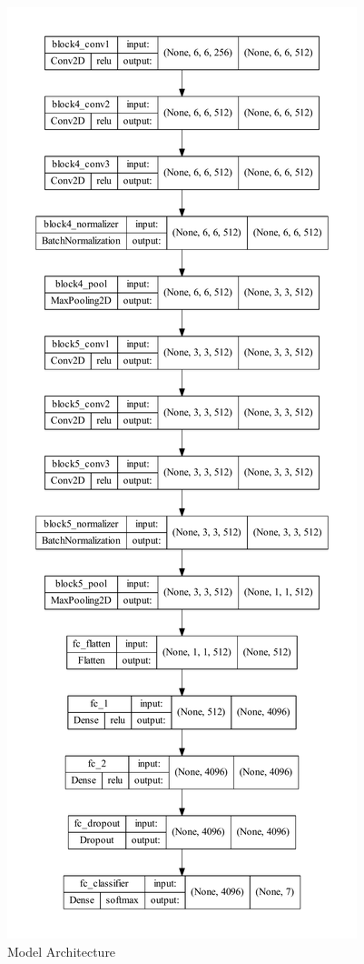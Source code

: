 \documentclass[11pt,a4paper]{article}
\begin{document}
\begin{figure}[H]
\begin{minipage}[b]{.4\textwidth}
        \end{minipage}
        \begin{minipage}[b]{.4\textwidth}
            \centering
            \includegraphics[height = 0.9\textheight]{written_report/pictures/model_2.pdf}
        \end{minipage}
        \caption{Model Architecture}
        \label{fig:model}
    \end{figure}
    
\end{document}
